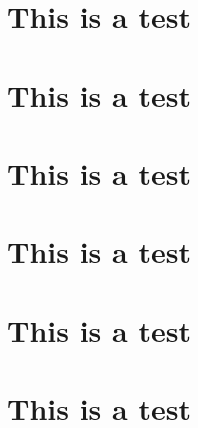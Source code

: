 \documentclass[12pt]{IEEEtran}
\begin{document}
\section{This is a test}
\blindtext
\section{This is a test}
\blindtext
\section{This is a test}
\blindtext
\section{This is a test}
\blindtext
\section{This is a test}
\blindtext
\section{This is a test}
\blindtext

\end{document}

